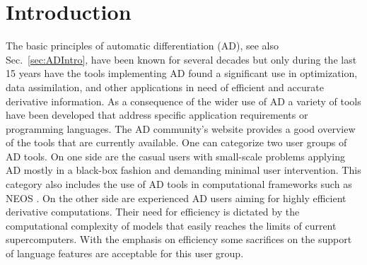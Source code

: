 \documentclass[11pt]{article}
\newcommand{\refsec}[1]{{Sec.~\ref{#1}}}
\begin{document}






\section{Introduction} \label{sec:Introduction}

The basic principles of automatic differentiation (AD), see also \refsec{sec:ADIntro}, 
have been known for several decades \cite{wengert}
but only during the last 15 years have the tools implementing AD found a significant use in 
optimization, data assimilation, and other applications in need of efficient and accurate 
derivative information. 
As a consequence of the wider use of AD 
a variety of tools have been developed that address specific 
application requirements or programming languages. 
The  AD community's website \cite{autodiffWeb} 
provides a good overview of the tools that 
are currently available. 
One can categorize two user groups of AD tools. 
On one side are the casual users 
with small-scale problems applying AD mostly in a black-box fashion 
and demanding minimal user intervention. 
This category also includes the use of AD tools in  computational 
frameworks such as NEOS \cite{neosWeb}.
On the other side are experienced AD users aiming for highly efficient 
derivative computations.
Their need for efficiency is dictated by the 
computational complexity of models that easily reaches the limits of  current 
supercomputers. 
With the emphasis on efficiency some sacrifices on the support of 
language features are acceptable for this user group.  
\end{document}
